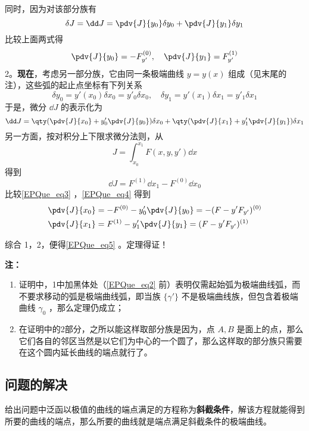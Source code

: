 同时，因为对该部分族有
\begin{equation}
\delta J=\dd J=\pdv{J}{y_0}\delta y_0+\pdv{J}{y_1}\delta y_1
\end{equation}
比较上面两式得
\begin{equation}
\pdv{J}{y_0}=-F_{y'}^{(0)},\quad \pdv{J}{y_1}=F_{y'}^{(1)}
\end{equation}
2。\textbf{现在}，考虑另一部分族，它由同一条极端曲线 $y=y(x)$ 组成（见末尾的注），这些弧的起止点坐标有下列关系
\begin{equation}
\delta y_0=y'(x_0)\delta x_0=y'_0\delta x_0,\quad \delta y_1=y'(x_1)\delta x_1=y'_1\delta x_1
\end{equation}
于是，微分 $\dd J$ 的表示化为
\begin{equation}\label{EPQue_eq3}
\dd J=\qty(\pdv{J}{x_0}+y'_0\pdv{J}{y_0})\delta x_0+\qty(\pdv{J}{x_1}+y'_1\pdv{J}{y_1})\delta x_1
\end{equation}
另一方面，按对积分上下限求微分法则，从
\begin{equation}
J=\int_{x_0}^{x_1}F(x,y,y')\dd x
\end{equation}
得到
\begin{equation}\label{EPQue_eq4}
\dd J=F^{(1)}\dd x_1-F^{(0)}\dd x_0
\end{equation}
比较\autoref{EPQue_eq3} ，\autoref{EPQue_eq4} 得到
\begin{equation}
\begin{aligned}
&\pdv{J}{x_0}=-F^{(0)}-y'_0\pdv{J}{y_0}=-(F-y'F_{y'})^{(0)}\\
&\pdv{J}{x_1}=F^{(1)}-y'_1\pdv{J}{y_1}=(F-y'F_{y'})^{(1)}
\end{aligned}
\end{equation}

综合 1，2，便得\autoref{EPQue_eq5} 。定理得证！

\textbf{注：}
\begin{enumerate}
\item 证明中，1中加黑体处（\autoref{EPQue_eq2} 前）表明仅需起始弧为极端曲线弧，而不要求移动的弧是极端曲线弧，即当族 $\{\gamma'\}$ 不是极端曲线族，但包含着极端曲线 $\gamma_0$ ，那么定理仍成立；
\item 在证明中的2部分，之所以能这样取部分族是因为，点 $A,B$ 是面上的点，那么它们各自的邻区当然是以它们为中心的一个圆了，那么这样取的部分族只需要在这个圆内延长曲线的端点就行了。
\end{enumerate}
\subsection{问题的解决}
给出问题中泛函以极值的曲线的端点满足的方程称为\textbf{斜截条件}，解该方程就能得到所要的曲线的端点，那么所要的曲线就是端点满足斜截条件的极端曲线。
